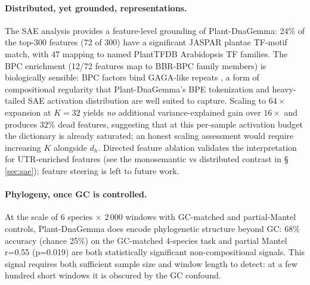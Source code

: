 \documentclass{article}
\begin{document}
\paragraph{Distributed, yet grounded, representations.}
The SAE analysis provides a feature-level grounding of Plant-DnaGemma:
24\% of the top-300 features (72 of 300) have a significant JASPAR plantae
TF-motif match, with 47 mapping to named PlantTFDB Arabidopsis TF
families. The BPC enrichment (12/72 features map to BBR-BPC family
members) is biologically sensible: BPC factors bind GAGA-like repeats
\citep{meister2004high}, a form of compositional regularity that
Plant-DnaGemma's BPE tokenization and heavy-tailed SAE activation
distribution are well suited to capture. Scaling to $64\times$ expansion
at $K=32$ yields \emph{no} additional variance-explained gain over
$16\times$ and produces 32\% dead features, suggesting that at this
per-sample activation budget the dictionary is already saturated; an
honest scaling assessment would require increasing $K$ alongside $d_h$.
Directed feature ablation validates the interpretation for UTR-enriched
features (see the monosemantic vs distributed contrast in §%
\ref{sec:sae}); feature steering is left to future work.

\paragraph{Phylogeny, once GC is controlled.}
At the scale of 6 species $\times$ 2\,000 windows with GC-matched and
partial-Mantel controls, Plant-DnaGemma does encode phylogenetic structure
beyond GC: 68\% accuracy (chance 25\%) on the GC-matched 4-species task
and partial Mantel r=0.55 (p=0.019) are both statistically significant
non-compositional signals. This signal requires both sufficient sample size
and window length to detect: at a few hundred short windows it is obscured
by the GC confound.
\end{document}
